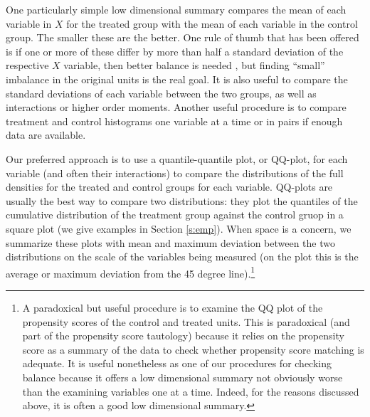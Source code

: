 \documentclass[11pt,titlepage]{article}
\begin{document}
One particularly simple low dimensional summary compares the mean of
each variable in $X$ for the treated group with the mean of each
variable in the control group.  The smaller these are the better.  One
rule of thumb that has been offered is if one or more of these differ
by more than half a standard deviation of the respective $X$ variable,
then better balance is needed \citep{Cochran68}, but finding ``small''
imbalance in the original units is the real goal.  It is also useful
to compare the standard deviations of each variable between the two
groups, as well as interactions or higher order moments.  Another
useful procedure is to compare treatment and control histograms one
variable at a time or in pairs if enough data are
available.

Our preferred approach is to use a quantile-quantile plot, or QQ-plot,
for each variable (and often their interactions) to compare the
distributions of the full densities for the treated and control groups
for each variable.  QQ-plots are usually the best way to compare two
distributions: they plot the quantiles of the cumulative distribution
of the treatment group against the control gruop in a square plot (we
give examples in Section \ref{s:emp}).  When space is a concern, we
summarize these plots with mean and maximum deviation between the two
distributions on the scale of the variables being measured (on the
plot this is the average or maximum deviation from the 45 degree
line).\footnote{A paradoxical but useful procedure is to examine the
  QQ plot of the propensity scores of the control and treated units.
  This is paradoxical (and part of the propensity score tautology)
  because it relies on the propensity score as a summary of the data
  to check whether propensity score matching is adequate.  It is
  useful nonetheless as one of our procedures for checking balance
  because it offers a low dimensional summary not obviously worse than
  the examining variables one at a time.  Indeed, for the reasons
  discussed above, it is often a good low dimensional summary.}
\end{document}

